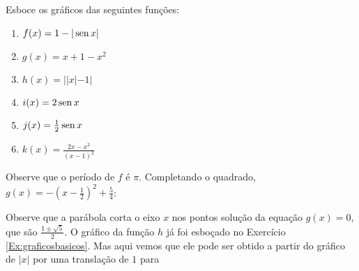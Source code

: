 \begin{exo}\label{Ex:graficosbasicos}
Esboce os gráficos das seguintes funções:
\begin{multicols}{3}
 \begin{enumerate}
  \item $f(x)=1-|\operatorname{sen} x|$
  \item $g(x)=x+1-x^2$
  \item $h(x)=||x|-1|$
\item $i(x)=2\operatorname{sen} x$
\item $j(x)=\frac{1}{2}\operatorname{sen} x$
\item $k(x)=\frac{2x-x^2}{(x-1)^2}$
 \end{enumerate}
\end{multicols}
\vspace{0.01cm}
\begin{sol}\mbox{}
\begin{center}
 \begin{bmlimage}\end{bmlimage}
\end{center}
Observe que o período de $f$ é $\pi$. Completando o quadrado,
$g(x)=-(x-\tfrac12)^2+\tfrac{5}{4}$:
\begin{center}
\begin{bmlimage}\end{bmlimage}
\end{center}
 Observe que a parábola corta o eixo $x$ nos pontos solução da equação $g(x)=0$, que são
$\frac{1\pm \sqrt{5}}{2}$.
 O gráfico da função $h$ já foi esboçado no Exercício \ref{Ex:graficosbasicos}. Mas aqui
vemos que ele pode ser obtido a partir do gráfico de $|x|$ por uma translação de $1$ para

\end{sol}
\end{exo}
